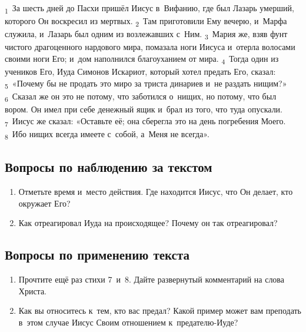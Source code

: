 \documentclass[a4paper,12pt]{article}
\begin{document}
\textsubscript{1}~За шесть дней до Пасхи пришёл Иисус в~Вифанию, где был Лазарь умерший, которого Он воскресил из мертвых.
\textsubscript{2}~Там приготовили Ему вечерю, и~Марфа служила, и~Лазарь был одним из возлежавших с~Ним.
\textsubscript{3}~Мария же, взяв фунт чистого драгоценного нардового мира, помазала ноги Иисуса и~отерла волосами своими ноги Его; и~дом наполнился благоуханием от мира.
\textsubscript{4}~Тогда один из учеников Его, Иуда Симонов Искариот, который хотел предать Его, сказал:
\textsubscript{5}~«Почему бы не продать это миро за триста динариев и~не раздать нищим?»
\textsubscript{6}~Сказал же он это не потому, что заботился о~нищих, но потому, что был вором. Он имел при себе денежный ящик и~брал из того, что туда опускали.
\textsubscript{7}~Иисус же сказал: «Оставьте её; она сберегла это на день погребения Моего.
\textsubscript{8}~Ибо нищих всегда имеете с~собой, а~Меня не всегда».

\subsection*{Вопросы по наблюдению за текстом}
\begin{enumerate}
    \item Отметьте время и~место действия. Где находится Иисус, что Он делает, кто окружает Его? 
    
    \myline
    
    \myline
    \item Как отреагировал Иуда на происходящее? Почему он так отреагировал? 
    
    \myline
    
    \myline
\end{enumerate}

\subsection*{Вопросы по применению текста} 
\begin{enumerate}
    \item Прочтите ещё раз стихи 7~и~8. Дайте развернутый комментарий на слова Христа. 
    
    \myline
    
    \myline
    \item Как вы относитесь к~тем, кто вас предал? Какой пример может вам преподать в~этом случае Иисус Своим отношением к~предателю-Иуде? 
    
    \myline
    
    \myline
\end{enumerate}
\end{document}
